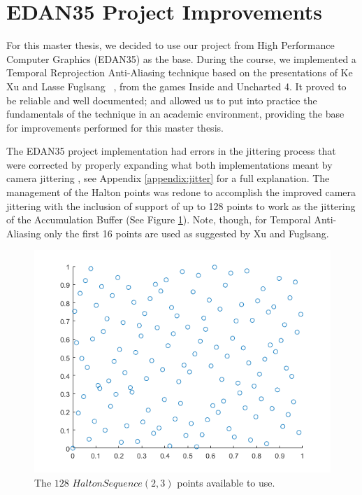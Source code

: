 \documentclass{cslthse-msc}
\begin{document}
\section{EDAN35 Project Improvements}
For this master thesis, we decided to use our project from High Performance Computer Graphics (EDAN35) as the base. During the course, we implemented a Temporal Reprojection Anti-Aliasing technique based on the presentations of Ke Xu and Lasse Fuglsang ~\cite{XU2016,Fuglsand2016}, from the games Inside and Uncharted 4. It proved to be reliable and well documented; and allowed us to put into practice the fundamentals of the technique in an academic environment, providing the base for improvements performed for this master thesis.

The EDAN35 project implementation had errors in the jittering process that were corrected by properly expanding what both implementations meant by camera jittering , see Appendix \ref{appendix:jitter} for a full explanation. The management of the Halton points was redone to accomplish the improved camera jittering with the inclusion of support of up to 128 points to work as the jittering of the Accumulation Buffer (See Figure \ref{fig:halton128}). Note, though, for Temporal Anti-Aliasing only the first 16 points are used as suggested by Xu and Fuglsang. ~\cite{XU2016,Fuglsand2016}

\begin{figure}[!hbt]
	\centering
	\includegraphics[scale=0.5]{images/halton_128.png}
	\caption{The $128$ $Halton Sequence (2,3)$ points available to use.}\label{fig:halton128}
\end{figure}
\end{document}
